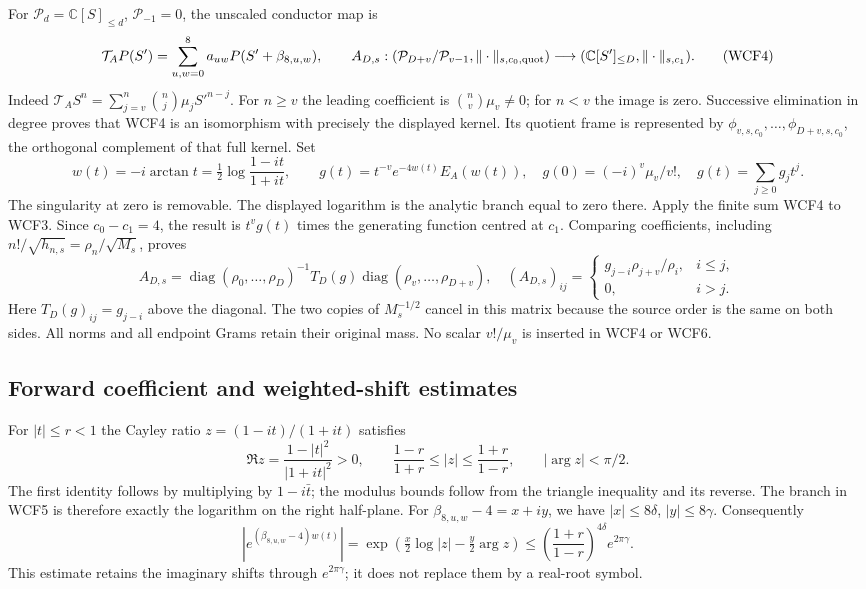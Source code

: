 For $\mathcal P_d=\mathbb C[S]_{\le d}$, $\mathcal P_{-1}=0$, the
unscaled conductor map is
\[
 \mathcal T_A P(S')=\sum_{u,w=0}^{8}a_{uw}P(S'+\beta_{8,u,w}),\qquad
 A_{D,s}:(\mathcal P_{D+v}/\mathcal P_{v-1},\|\cdot\|_{s,c_0,\rm quot})
       \longrightarrow(\mathbb C[S']_{\le D},\|\cdot\|_{s,c_1}).
 \tag{WCF4}
\]
Indeed $\mathcal T_A S^n=\sum_{j=v}^n\binom nj\mu_j S'^{n-j}$.
For $n\ge v$ the leading coefficient is $\binom nv\mu_v\ne0$;
for $n<v$ the image is zero. Successive elimination in degree proves
that WCF4 is an isomorphism with precisely the displayed kernel.
Its quotient frame is represented by
$\phi_{v,s,c_0},\ldots,\phi_{D+v,s,c_0}$, the orthogonal complement
of that full kernel. Set
\[
 w(t)=-i\arctan t=\tfrac12\log\frac{1-it}{1+it},\qquad
 g(t)=t^{-v}e^{-4w(t)}E_A(w(t)),\quad
 g(0)=(-i)^v\mu_v/v!,\quad g(t)=\sum_{j\ge0}g_jt^j.
 \tag{WCF5}
\]
The singularity at zero is removable. The displayed logarithm is the
analytic branch equal to zero there. Apply the finite sum WCF4 to WCF3.
Since $c_0-c_1=4$, the result is $t^vg(t)$ times the generating
function centred at $c_1$. Comparing coefficients, including
$n!/\sqrt{h_{n,s}}=\rho_n/\sqrt{M_s}$, proves
\[
 A_{D,s}=\operatorname{diag}(\rho_0,\ldots,\rho_D)^{-1}
          T_D(g)\operatorname{diag}(\rho_v,\ldots,\rho_{D+v}),
 \quad
 (A_{D,s})_{ij}=\begin{cases}g_{j-i}\rho_{j+v}/\rho_i,&i\le j,\\0,&i>j.
 \end{cases}
 \tag{WCF6}
\]
Here $T_D(g)_{ij}=g_{j-i}$ above the diagonal. The two copies of
$M_s^{-1/2}$ cancel in this matrix because the source order is the same
on both sides. All norms and all endpoint Grams retain their original
mass. No scalar $v!/\mu_v$ is inserted in WCF4 or WCF6.

\subsection{Forward coefficient and weighted-shift estimates}

For $|t|\le r<1$ the Cayley ratio $z=(1-it)/(1+it)$ satisfies
\[
 \Re z=\frac{1-|t|^2}{|1+it|^2}>0,\qquad
 \frac{1-r}{1+r}\le|z|\le\frac{1+r}{1-r},\qquad
 |\arg z|<\pi/2.
 \tag{WCF7}
\]
The first identity follows by multiplying by $1-i\bar t$; the
modulus bounds follow from the triangle inequality and its reverse.
The branch in WCF5 is therefore exactly the logarithm on the right
half-plane. For $\beta_{8,u,w}-4=x+iy$, we have
$|x|\le8\delta$, $|y|\le8\gamma$. Consequently
\[
 \left|e^{(\beta_{8,u,w}-4)w(t)}\right|
 =\exp\!\left(\tfrac{x}{2}\log|z|-\tfrac{y}{2}\arg z\right)
 \le\left(\frac{1+r}{1-r}\right)^{4\delta}e^{2\pi\gamma}.
 \tag{WCF8}
\]
This estimate retains the imaginary shifts through $e^{2\pi\gamma}$;
it does not replace them by a real-root symbol.

